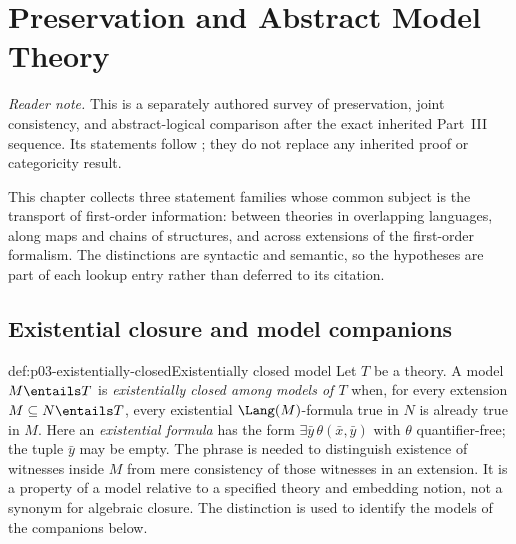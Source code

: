 
\chapter{Preservation and Abstract Model Theory}
\label{sec:p03-preservation-abstract}

\noindent\textit{Reader note.}  This is a separately authored survey of
preservation, joint consistency, and abstract-logical comparison after the
exact inherited Part~III sequence.  Its statements follow
\cite{ChangKeisler1990,Lindstrom1969}; they do not replace any inherited proof
or categoricity result.

This chapter collects three statement families whose common subject is the
transport of first-order information: between theories in overlapping
languages, along maps and chains of structures, and across extensions of the
first-order formalism.  The distinctions are syntactic and semantic, so the
hypotheses are part of each lookup entry rather than deferred to its citation.

\section{Existential closure and model companions}
\label{sec:p03-model-companions}

\begin{hbdefinition}{def:p03-existentially-closed}{Existentially closed model}
Let \(T\) be a theory.  A model \(M\entails T\) is
\emph{existentially closed among models of \(T\)} when, for every extension
\(M\subseteq N\entails T\), every existential \(\Lang(M)\)-formula true in
\(N\) is already true in \(M\).  Here an \emph{existential formula} has the
form \(\exists\bar y\,\theta(\bar x,\bar y)\) with \(\theta\)
quantifier-free; the tuple \(\bar y\) may be empty.  The phrase is needed to distinguish
existence of witnesses inside \(M\) from mere consistency of those witnesses
in an extension.  It is a property of a model relative to a specified theory
and embedding notion, not a synonym for algebraic closure.  The distinction
is used to identify the models of the companions below.
\end{hbdefinition}

